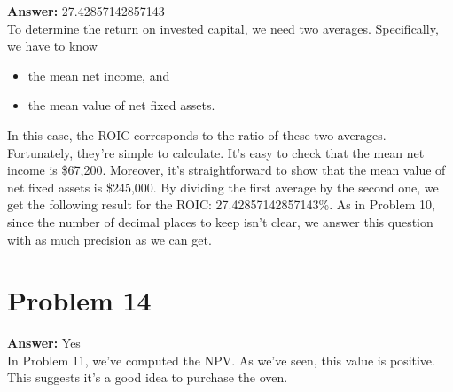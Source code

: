 \documentclass[11pt]{article}
\begin{document}
\textbf{Answer:} 27.42857142857143\\

To determine the return on invested capital, we need two averages. Specifically,
we have to know
\begin{itemize}
\item the mean net income, and
\item the mean value of net fixed assets.
\end{itemize}
In this case, the ROIC corresponds to the ratio of these two averages.
Fortunately, they're simple to calculate. It's easy to check that the mean net
income is \$67,200. Moreover, it's straightforward to show that the mean value of
net fixed assets is \$245,000. By dividing the first average by the second one,
we get the following result for the ROIC: 27.42857142857143\%. As in Problem 10,
since the number of decimal places to keep isn't clear, we answer this question
with as much precision as we can get.
\section*{Problem 14}
\label{sec:orga47f46c}

\textbf{Answer:} Yes\\

In Problem 11, we've computed the NPV. As we've seen, this value is positive.
This suggests it's a good idea to purchase the oven.
\end{document}

